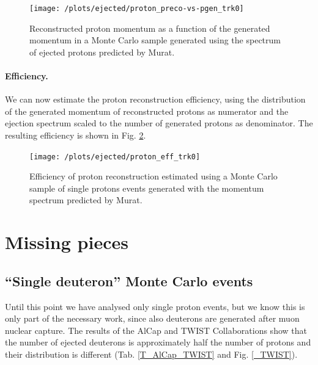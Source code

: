 \documentclass[12pt,a4paper,openright, oneside, titlepage]{book} %
\begin{document}
\begin{figure}[!htb]
\centering
\texttt{[image: /plots/ejected/proton\_preco-vs-pgen\_trk0]}
\caption[Reconstructed vs generated momentum (ejected protons)]
{Reconstructed proton momentum as a function of the generated momentum 
in a Monte Carlo sample generated
using the spectrum of ejected protons predicted by Murat.}
\label{_proton_preco-vs-pgen_trk0}
\end{figure}

\paragraph{Efficiency.} We can now estimate the proton reconstruction efficiency, 
using the distribution of the generated momentum of reconstructed protons as numerator 
and the ejection spectrum scaled to the number of generated protons as denominator. 
The resulting efficiency is shown in Fig. \ref{_proton_eff_trk0}.

\begin{figure}[!htb]
\centering
\texttt{[image: /plots/ejected/proton\_eff\_trk0]}
\caption[Efficiency of proton reconstruction]
{Efficiency of proton reconstruction estimated using a Monte Carlo sample of single protons events 
generated with the momentum spectrum predicted by Murat.}
\label{_proton_eff_trk0}
\end{figure}

\section{Missing pieces}
\subsection{``Single deuteron'' Monte Carlo events}
Until this point we have analysed only single proton events, 
but we know this is only part of the necessary work, 
since also deuterons are generated after muon nuclear capture.
The results of the AlCap and TWIST Collaborations
show that the number of ejected deuterons is approximately 
half the number of protons and their distribution is different
(Tab. \ref{T_AlCap_TWIST} and Fig. \ref{_TWIST}).
\end{document}
